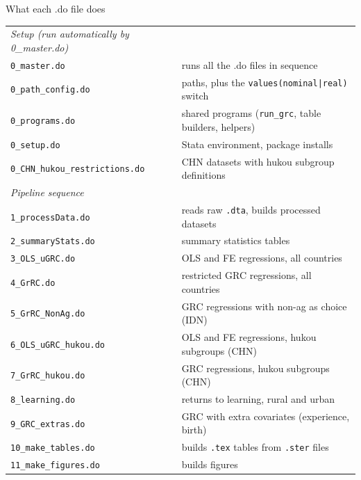 \documentclass[10pt,aspectratio=169]{beamer}
\newcommand{\code}[1]{\texttt{\small #1}}
\begin{document}
\begin{frame}{What each .do file does}

\scriptsize
\begin{tabular}{@{}l p{}@{}}
\textcolor{cktgray}{\textit{Setup (run automatically by 0\_master.do)}} & \\
\code{0\_master.do}                   & runs all the .do files in sequence \\
\code{0\_path\_config.do}             & paths, plus the \code{values(nominal|real)} switch \\
\code{0\_programs.do}                 & shared programs (\code{run\_grc}, table builders, helpers) \\
\code{0\_setup.do}                    & Stata environment, package installs \\
\code{0\_CHN\_hukou\_restrictions.do} & CHN datasets with hukou subgroup definitions \\
\addlinespace
\textcolor{cktgray}{\textit{Pipeline sequence}} & \\
\code{1\_processData.do}              & reads raw \code{.dta}, builds processed datasets \\
\code{2\_summaryStats.do}             & summary statistics tables \\
\code{3\_OLS\_uGRC.do}                & OLS and FE regressions, all countries \\
\code{4\_GrRC.do}                     & restricted GRC regressions, all countries \\
\code{5\_GrRC\_NonAg.do}              & GRC regressions with non-ag as choice (IDN) \\
\code{6\_OLS\_uGRC\_hukou.do}         & OLS and FE regressions, hukou subgroups (CHN) \\
\code{7\_GrRC\_hukou.do}              & GRC regressions, hukou subgroups (CHN) \\
\code{8\_learning.do}                 & returns to learning, rural and urban \\
\code{9\_GRC\_extras.do}              & GRC with extra covariates (experience, birth) \\
\code{10\_make\_tables.do}            & builds \code{.tex} tables from \code{.ster} files \\
\code{11\_make\_figures.do}           & builds figures \\
\end{tabular}

\end{frame}
\end{document}
